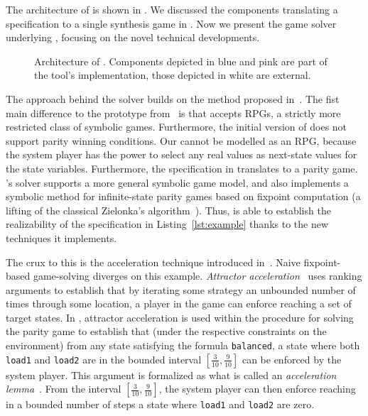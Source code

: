 The architecture of \issy is shown in .  We discussed the components translating a specification to a single synthesis game in .
Now we present the game solver underlying \issy, focusing on the novel  technical developments.

\begin{figure}[t!]

\vspace{-.7cm}
\caption{Architecture of \issy. Components depicted in blue and pink are part of the tool's implementation, those depicted in white are external.}
\label{fig:toolchain}
\end{figure}

The approach behind the \issy solver builds on the method proposed in~\cite{HeimD24}.
The fist main difference to the prototype \rpgsolve from~\cite{HeimD24} is that \rpgsolve accepts RPGs,  a strictly more restricted class of symbolic games.  Furthermore,  the initial version of \rpgsolve does not support parity winning conditions.   
Our  cannot be modelled as an RPG,  because the system player has the power to select any real values as next-state values for the state variables.
Furthermore,  the specification in  translates to a parity game.
\issy's solver supports a more general symbolic game model, and also implements a symbolic method for infinite-state parity games based on fixpoint computation (a lifting of the classical Zielonka's algorithm~\cite{Zielonka98}).  Thus,  \issy is able to establish the realizability of the specification in Listing~\ref{lst:example} thanks to the new techniques it implements.

The crux to this is the acceleration technique introduced in~\cite{HeimD24}.
Naive fixpoint-based game-solving diverges on this example.
\emph{Attractor acceleration}~\cite{HeimD24} uses ranking arguments to establish that by iterating some strategy an unbounded number of times through some location, a player in the game can  enforce reaching a set of target states.  In ,  attractor acceleration is used within the procedure for solving the parity game to establish that (under the respective constraints on the environment) from any state satisfying the formula \texttt{balanced},  a state where both \texttt{load1} and \texttt{load2} are in the bounded interval $[\frac{3}{10},\frac{9}{10}]$ can be enforced by the system player.  This argument is formalized as what is called an \emph{acceleration lemma}~\cite{HeimD24}.  From the interval $[\frac{3}{10},\frac{9}{10}]$,  the system player can then enforce reaching in a bounded number of steps a state where  \texttt{load1} and \texttt{load2} are zero.

